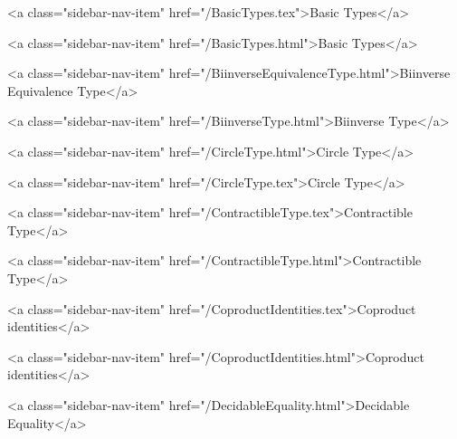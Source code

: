       
        
          <a class="sidebar-nav-item" href="/BasicTypes.tex">Basic Types</a>
        
      
    
      
        
          <a class="sidebar-nav-item" href="/BasicTypes.html">Basic Types</a>
        
      
    
      
        
          <a class="sidebar-nav-item" href="/BiinverseEquivalenceType.html">Biinverse Equivalence Type</a>
        
      
    
      
        
          <a class="sidebar-nav-item" href="/BiinverseType.html">Biinverse Type</a>
        
      
    
      
        
          <a class="sidebar-nav-item" href="/CircleType.html">Circle Type</a>
        
      
    
      
        
          <a class="sidebar-nav-item" href="/CircleType.tex">Circle Type</a>
        
      
    
      
        
          <a class="sidebar-nav-item" href="/ContractibleType.tex">Contractible Type</a>
        
      
    
      
        
          <a class="sidebar-nav-item" href="/ContractibleType.html">Contractible Type</a>
        
      
    
      
        
          <a class="sidebar-nav-item" href="/CoproductIdentities.tex">Coproduct identities</a>
        
      
    
      
        
          <a class="sidebar-nav-item" href="/CoproductIdentities.html">Coproduct identities</a>
        
      
    
      
        
          <a class="sidebar-nav-item" href="/DecidableEquality.html">Decidable Equality</a>
        
